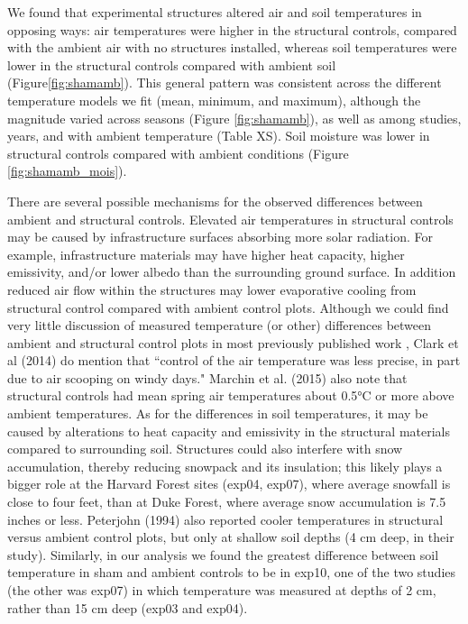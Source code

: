 \documentclass{article}
\begin{document}
\par We found that experimental structures altered air and soil temperatures in opposing ways:  air temperatures were higher in the structural controls, compared with the ambient air with no structures installed, whereas soil temperatures were lower in the structural controls compared with ambient soil (Figure\ref{fig:shamamb}). This general pattern was consistent across the different temperature models we fit (mean, minimum, and maximum), although the magnitude varied across seasons (Figure \ref{fig:shamamb}), as well as among studies, years, and with ambient temperature (Table XS). Soil moisture was lower in structural controls compared with ambient conditions (Figure \ref{fig:shamamb_mois}). 
\par There are several possible mechanisms for the observed differences between ambient and structural controls. Elevated air temperatures in structural controls may be caused by infrastructure surfaces absorbing more solar radiation. For example, infrastructure materials may have higher heat capacity, higher emissivity, and/or lower albedo than the surrounding ground surface. In addition reduced air flow within the structures may lower evaporative cooling from structural control compared with ambient control plots. Although we could find very little discussion of measured temperature (or other) differences between ambient and structural control plots in most previously published work \citep[e.g.][]{farnsworth1995,pelini2011,clark2014a,clark2014b}, Clark et al (2014) do mention that ``control of the air temperature was less precise, in part due to air scooping on windy days." Marchin et al. (2015) also note that structural controls had mean spring air temperatures about 0.5°C or more above ambient temperatures. As for the differences in soil temperatures, it may be caused by alterations to heat capacity and emissivity in the structural materials compared to surrounding soil. Structures could also interfere with snow accumulation, thereby reducing snowpack and its insulation; this likely plays a bigger role at the Harvard Forest sites (exp04, exp07), where average snowfall is close to four feet, than at Duke Forest, where average snow accumulation is 7.5 inches or less. Peterjohn (1994) also reported cooler temperatures in structural versus ambient control plots, but only at shallow soil depths (4 cm deep, in their study). Similarly, in our analysis we found the greatest difference between soil temperature in sham and ambient controls to be in exp10, one of the two studies (the other was exp07) in which temperature was measured at depths of 2 cm, rather than 15 cm deep (exp03 and exp04). 
\end{document}
